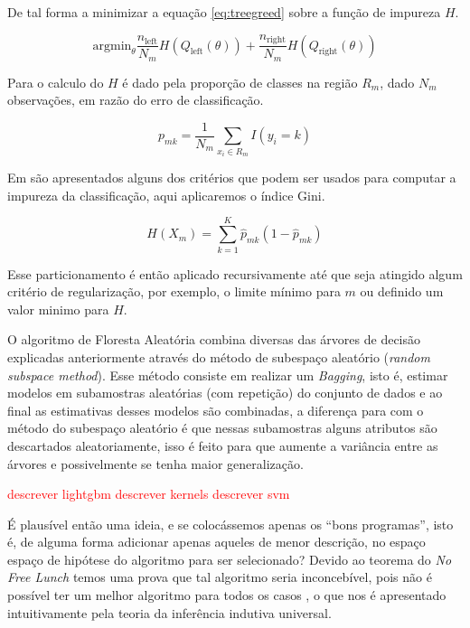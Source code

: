 De tal forma a minimizar a equação \ref{eq:treegreed} sobre a função de
impureza $H$.

\begin{equation}
    \text{argmin}_{\theta} \frac{n_{\text{left}}}{N_m} H(Q_{\text{left}}(\theta)) +
    \frac{n_{\text{right}}}{N_m} H(Q_{\text{right}}(\theta))
    \label{eq:treegreed}
\end{equation}

Para o calculo do $H$ é dado pela proporção de classes na região $R_m$,
dado $N_m$ observações, em razão do erro de classificação.

\begin{equation}
    p_{mk} = \frac{1}{N_m} \sum_{x_i \in R_m} I(y_i = k)
\end{equation}

Em \cite{friedman2001elements} são apresentados alguns dos critérios que podem
ser usados para computar a impureza da classificação, aqui aplicaremos o índice
Gini.

\begin{equation}
    H(X_m) = \sum_{k=1}^{K} \hat{p}_{mk}(1 - \hat{p}_{mk})
    \label{eq:gini}
\end{equation}

Esse particionamento é então aplicado recursivamente até que seja atingido
algum critério de regularização, por exemplo, o limite mínimo para $m$ ou
definido um valor minimo para $H$.

O algoritmo de Floresta Aleatória combina diversas das árvores de decisão
explicadas anteriormente através do método de subespaço aleatório
(\textit{random subspace method}). Esse método consiste em realizar um
\textit{Bagging}, isto é, estimar modelos em subamostras aleatórias (com
repetição) do conjunto de dados e ao final as estimativas desses modelos são
combinadas, a diferença para com o método do subespaço aleatório é que nessas
subamostras alguns atributos são descartados aleatoriamente, isso é feito para
que aumente a variância entre as árvores e possivelmente se tenha maior
generalização.



\textcolor{red}{
descrever lightgbm
descrever kernels
descrever svm
}

É plausível então uma ideia, e se colocássemos apenas os ``bons programas'',
isto é, de alguma forma adicionar apenas aqueles de menor descrição, no espaço
espaço de hipótese do algoritmo para ser selecionado? Devido ao teorema do
\textit{No Free Lunch} \cite{wolpert1997no,wolpert1996lack} temos uma prova que
tal algoritmo seria inconcebível, pois não é possível ter um melhor algoritmo
para todos os casos \cite{rathmanner2011philosophical}, o que nos é apresentado
intuitivamente pela teoria da inferência indutiva universal.

